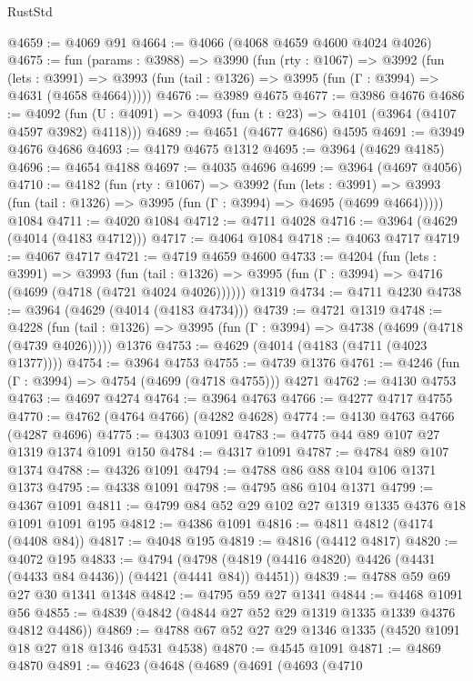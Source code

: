 \begin{lexlean}{RustStd}
\begin{coremodule}
{\begin{coremodule}
{{{{{{{{{{{{{{{{{{{{{{{{{{{{{{{{{{{{{{@4659 := @4069 @91
@4664 := @4066 (@4068 @4659 @4600 @4024 @4026)
@4675 := fun (params : @3988) =>
  @3990
    (fun (rty : @1067) =>
    @3992
      (fun (lets : @3991) =>
      @3993 (fun (tail : @1326) => @3995 (fun (Γ : @3994) => @4631 (@4658 @4664)))))
@4676 := @3989 @4675
@4677 := @3986 @4676
@4686 := @4092 (fun (U : @4091) => @4093 (fun (t : @23) => @4101 (@3964 (@4107 @4597 @3982) @4118)))
@4689 := @4651 (@4677 @4686) @4595
@4691 := @3949 @4676 @4686
@4693 := @4179 @4675 @1312
@4695 := @3964 (@4629 @4185)
@4696 := @4654 @4188
@4697 := @4035 @4696
@4699 := @3964 (@4697 @4056)
@4710 := @4182
    (fun (rty : @1067) =>
    @3992
      (fun (lets : @3991) =>
      @3993 (fun (tail : @1326) => @3995 (fun (Γ : @3994) => @4695 (@4699 @4664)))))
    @1084
@4711 := @4020 @1084
@4712 := @4711 @4028
@4716 := @3964 (@4629 (@4014 (@4183 @4712)))
@4717 := @4064 @1084
@4718 := @4063 @4717
@4719 := @4067 @4717
@4721 := @4719 @4659 @4600
@4733 := @4204
    (fun (lets : @3991) =>
    @3993
      (fun (tail : @1326) => @3995 (fun (Γ : @3994) => @4716 (@4699 (@4718 (@4721 @4024 @4026))))))
    @1319
@4734 := @4711 @4230
@4738 := @3964 (@4629 (@4014 (@4183 @4734)))
@4739 := @4721 @1319
@4748 := @4228
    (fun (tail : @1326) => @3995 (fun (Γ : @3994) => @4738 (@4699 (@4718 (@4739 @4026)))))
    @1376
@4753 := @4629 (@4014 (@4183 (@4711 (@4023 @1377))))
@4754 := @3964 @4753
@4755 := @4739 @1376
@4761 := @4246 (fun (Γ : @3994) => @4754 (@4699 (@4718 @4755))) @4271
@4762 := @4130 @4753
@4763 := @4697 @4274
@4764 := @3964 @4763
@4766 := @4277 @4717 @4755
@4770 := @4762 (@4764 @4766) (@4282 @4628)
@4774 := @4130 @4763 @4766 (@4287 @4696)
@4775 := @4303 @1091
@4783 := @4775 @44 @89 @107 @27 @1319 @1374 @1091 @150
@4784 := @4317 @1091
@4787 := @4784 @89 @107 @1374
@4788 := @4326 @1091
@4794 := @4788 @86 @88 @104 @106 @1371 @1373
@4795 := @4338 @1091
@4798 := @4795 @86 @104 @1371
@4799 := @4367 @1091
@4811 := @4799 @84 @52 @29 @102 @27 @1319 @1335 @4376 @18 @1091 @1091 @195
@4812 := @4386 @1091
@4816 := @4811 @4812 (@4174 (@4408 @84))
@4817 := @4048 @195
@4819 := @4816 (@4412 @4817)
@4820 := @4072 @195
@4833 := @4794
    (@4798 (@4819 (@4416 @4820) @4426 (@4431 (@4433 @84 @4436)) (@4421 (@4441 @84)) @4451))
@4839 := @4788 @59 @69 @27 @30 @1341 @1348
@4842 := @4795 @59 @27 @1341
@4844 := @4468 @1091 @56
@4855 := @4839 (@4842 (@4844 @27 @52 @29 @1319 @1335 @1339 @4376 @4812 @4486))
@4869 := @4788 @67 @52 @27 @29 @1346 @1335 (@4520 @1091 @18 @27 @18 @1346 @4531 @4538)
@4870 := @4545 @1091
@4871 := @4869 @4870
@4891 := @4623
    (@4648
      (@4689
        (@4691
          (@4693
            (@4710
}}}}}}}}}}}}}}}}}}}}}}}}}}}}}}}}}}}}}}
\end{coremodule}}
\end{coremodule}
\end{lexlean}
